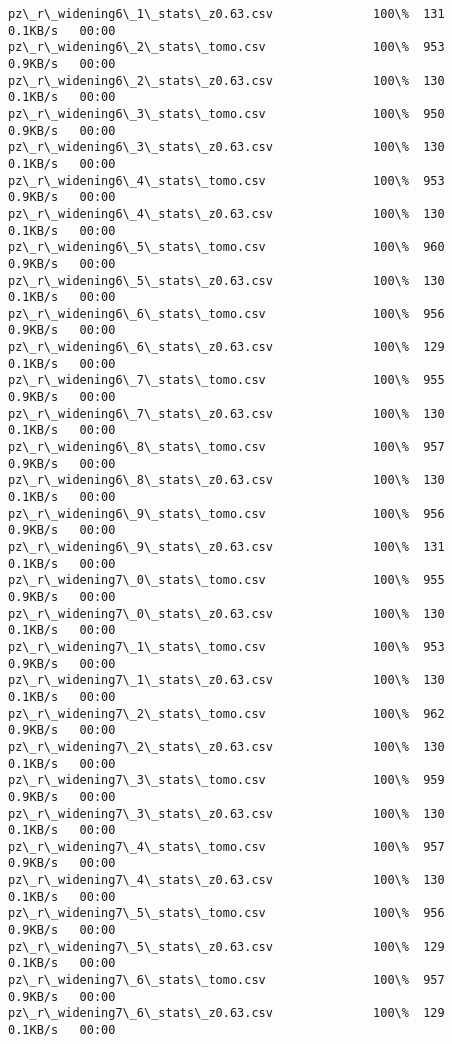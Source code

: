 \documentclass[11pt]{article}
\begin{document}
\begin{Verbatim}[commandchars=\\\{\}]
pz\_r\_widening6\_1\_stats\_z0.63.csv              100\%  131     0.1KB/s   00:00    
pz\_r\_widening6\_2\_stats\_tomo.csv               100\%  953     0.9KB/s   00:00    
pz\_r\_widening6\_2\_stats\_z0.63.csv              100\%  130     0.1KB/s   00:00    
pz\_r\_widening6\_3\_stats\_tomo.csv               100\%  950     0.9KB/s   00:00    
pz\_r\_widening6\_3\_stats\_z0.63.csv              100\%  130     0.1KB/s   00:00    
pz\_r\_widening6\_4\_stats\_tomo.csv               100\%  953     0.9KB/s   00:00    
pz\_r\_widening6\_4\_stats\_z0.63.csv              100\%  130     0.1KB/s   00:00    
pz\_r\_widening6\_5\_stats\_tomo.csv               100\%  960     0.9KB/s   00:00    
pz\_r\_widening6\_5\_stats\_z0.63.csv              100\%  130     0.1KB/s   00:00    
pz\_r\_widening6\_6\_stats\_tomo.csv               100\%  956     0.9KB/s   00:00    
pz\_r\_widening6\_6\_stats\_z0.63.csv              100\%  129     0.1KB/s   00:00    
pz\_r\_widening6\_7\_stats\_tomo.csv               100\%  955     0.9KB/s   00:00    
pz\_r\_widening6\_7\_stats\_z0.63.csv              100\%  130     0.1KB/s   00:00    
pz\_r\_widening6\_8\_stats\_tomo.csv               100\%  957     0.9KB/s   00:00    
pz\_r\_widening6\_8\_stats\_z0.63.csv              100\%  130     0.1KB/s   00:00    
pz\_r\_widening6\_9\_stats\_tomo.csv               100\%  956     0.9KB/s   00:00    
pz\_r\_widening6\_9\_stats\_z0.63.csv              100\%  131     0.1KB/s   00:00    
pz\_r\_widening7\_0\_stats\_tomo.csv               100\%  955     0.9KB/s   00:00    
pz\_r\_widening7\_0\_stats\_z0.63.csv              100\%  130     0.1KB/s   00:00    
pz\_r\_widening7\_1\_stats\_tomo.csv               100\%  953     0.9KB/s   00:00    
pz\_r\_widening7\_1\_stats\_z0.63.csv              100\%  130     0.1KB/s   00:00    
pz\_r\_widening7\_2\_stats\_tomo.csv               100\%  962     0.9KB/s   00:00    
pz\_r\_widening7\_2\_stats\_z0.63.csv              100\%  130     0.1KB/s   00:00    
pz\_r\_widening7\_3\_stats\_tomo.csv               100\%  959     0.9KB/s   00:00    
pz\_r\_widening7\_3\_stats\_z0.63.csv              100\%  130     0.1KB/s   00:00    
pz\_r\_widening7\_4\_stats\_tomo.csv               100\%  957     0.9KB/s   00:00    
pz\_r\_widening7\_4\_stats\_z0.63.csv              100\%  130     0.1KB/s   00:00    
pz\_r\_widening7\_5\_stats\_tomo.csv               100\%  956     0.9KB/s   00:00    
pz\_r\_widening7\_5\_stats\_z0.63.csv              100\%  129     0.1KB/s   00:00    
pz\_r\_widening7\_6\_stats\_tomo.csv               100\%  957     0.9KB/s   00:00    
pz\_r\_widening7\_6\_stats\_z0.63.csv              100\%  129     0.1KB/s   00:00    

\end{Verbatim}
\end{document}
